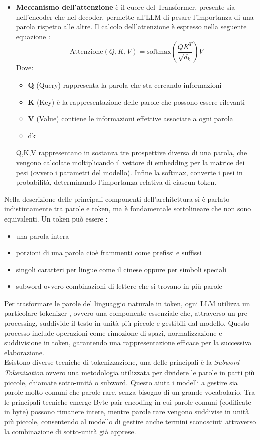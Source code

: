 \documentclass{article}
\begin{document}
\begin{itemize}
\item \textbf{Meccanismo dell'attenzione} è il cuore del Transformer, presente sia nell'encoder che nel decoder, permette all'LLM di pesare l'importanza di una parola rispetto alle altre. Il calcolo dell'attenzione è espresso nella seguente equazione \cite{vaswani2017attention}:
\[
    \text{Attenzione}(Q, K, V) = \text{softmax}\left(\frac{QK^T}{\sqrt{d_k}}\right) V
\]
Dove:
\begin{itemize}
    \item \textbf{Q} (Query) rappresenta la parola che sta cercando informazioni
    \item \textbf{K} (Key) è la rappresentazione delle parole che possono essere rilevanti
    \item \textbf{V} (Value) contiene le informazioni effettive associate a ogni parola
    \item dk
\end{itemize}
Q,K,V rappresentano in sostanza tre prospettive diversa di una parola, che vengono calcolate moltiplicando il vettore di embedding per la matrice dei pesi (ovvero i parametri del modello). Infine la softmax,  converte i pesi in probabilità, determinando l'importanza relativa di ciascun token.
\end{itemize}
Nella descrizione delle principali componenti dell'architettura si è parlato indistintamente tra parole e token, ma è fondamentale sottolineare che non sono equivalenti. Un token può essere \cite{mielke2021wordscharactersbriefhistory}:
\begin{itemize}
    \item una parola intera
    \item porzioni di una parola cioè frammenti come prefissi e suffissi 
    \item singoli caratteri per lingue come il cinese oppure per simboli speciali
    \item subword ovvero combinazioni di lettere che si trovano in più parole
\end{itemize}
Per trasformare le parole del linguaggio naturale in token, ogni LLM utilizza un particolare tokenizer \cite{huggingface_transformers_tokenizer}, ovvero una componente essenziale che, attraverso un pre-processing, suddivide il testo in unità più piccole e gestibili dal modello. Questo processo include operazioni come rimozione di spazi, normalizzazione e suddivisione in token, garantendo una rappresentazione efficace per la successiva elaborazione.\\
Esistono diverse tecniche di tokenizzazione, una delle principali è la \textit{Subword Tokenization} ovvero una metodologia utilizzata per dividere le parole in parti più piccole, chiamate sotto-unità o subword. Questo aiuta i modelli a gestire sia parole molto comuni che parole rare, senza bisogno di un grande vocabolario. Tra le principali tecniche emerge Byte pair encoding \cite{Sennrich2015NeuralMT} in cui parole comuni (codificate in byte) possono rimanere intere, mentre parole rare vengono suddivise in unità più piccole, consentendo al modello di gestire anche termini sconosciuti attraverso la combinazione di sotto-unità già apprese.\\
\end{document}
